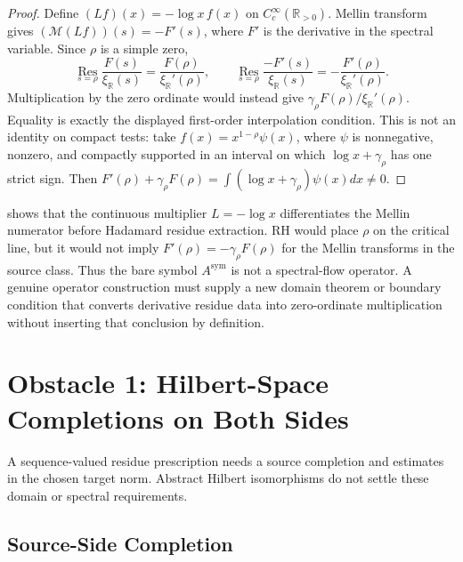 \begin{proof}
Define \((Lf)(x)=-\log x\,f(x)\) on \(C_c^\infty(\mathbb R_{>0})\). Mellin
transform gives
\((\mathcal{M}(Lf))(s)=-F'(s)\), where \(F'\) is the
derivative in the spectral variable. Since \(\rho\) is a simple zero,
\[
\operatorname*{Res}_{s=\rho}\frac{F(s)}{\xi_{\mathbb R}(s)}
=\frac{F(\rho)}{\xi_{\mathbb R}'(\rho)},
\qquad
\operatorname*{Res}_{s=\rho}\frac{-F'(s)}{\xi_{\mathbb R}(s)}
=-\frac{F'(\rho)}{\xi_{\mathbb R}'(\rho)}.
\]
Multiplication by the zero ordinate would instead give
\(\gamma_{\rho}F(\rho)/\xi_{\mathbb R}'(\rho)\). Equality is exactly
the displayed first-order interpolation condition.
This is not an identity on compact tests: take
\(f(x)=x^{1-\rho}\psi(x)\), where \(\psi\) is nonnegative, nonzero,
and compactly supported in an interval on which
\(\log x+\gamma_\rho\) has one strict sign. Then
\(F'(\rho)+\gamma_\rho F(\rho)
=\int(\log x+\gamma_\rho)\psi(x)dx\ne0\).
\end{proof}

\begin{remark}
\label{v4-arith:w9-r4:rem:formal-assumes-RH}
 shows that the continuous multiplier
\(L=-\log x\) differentiates the Mellin numerator before Hadamard residue
extraction. RH would place \(\rho\) on the critical line, but it would
not imply \(F'(\rho)=-\gamma_{\rho}F(\rho)\) for the Mellin transforms
in the source class. Thus the bare symbol
\(A^{\mathrm{sym}}\) is not a spectral-flow operator. A genuine
operator construction must supply a new domain theorem or boundary
condition that converts derivative residue data into zero-ordinate
multiplication without inserting that conclusion by definition.
\end{remark}

\section{Obstacle 1: Hilbert-Space Completions on Both Sides}
\label{v4-arith:w9-r4:obstacle-hilbert}

A sequence-valued residue prescription needs a source completion
and estimates in the chosen target norm. Abstract Hilbert
isomorphisms do not settle these domain or spectral requirements.

\subsection{Source-Side Completion}
\label{v4-arith:w9-r4:obstacle-hilbert:source}

